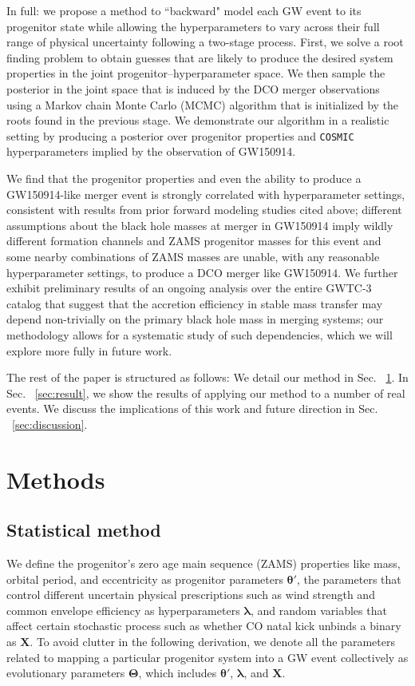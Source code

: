 \documentclass[linenumbers,twocolumn]{aastex631}
\begin{document}
In full: we propose a method to ``backward" model each GW event to its
progenitor state while allowing the hyperparameters to vary across their full
range of physical uncertainty following a two-stage process. First, we solve a
root finding problem to obtain guesses that are likely to produce the desired
system properties in the joint progenitor--hyperparameter space. We then sample
the posterior in the joint space that is induced by the DCO merger observations
using a Markov chain Monte Carlo (MCMC) algorithm that is initialized by the
roots found in the previous stage.  We demonstrate our algorithm in a realistic
setting by producing a posterior over progenitor properties and \texttt{COSMIC}
hyperparameters implied by the observation of GW150914.  

We find that the progenitor properties and even the ability to produce a
GW150914-like merger event is strongly correlated with hyperparameter settings,
consistent with results from prior forward modeling studies cited above;
different assumptions about the black hole masses at merger in GW150914 imply
wildly different formation channels and ZAMS progenitor masses for this event
and some nearby combinations of ZAMS masses are unable, with any reasonable
hyperparameter settings, to produce a DCO merger like GW150914.  We further
exhibit preliminary results of an ongoing analysis over the entire GWTC-3
catalog \citep{GWTC-3} that suggest that the accretion efficiency in stable mass
transfer may depend non-trivially on the primary black hole mass in merging
systems; our methodology allows for a systematic study of such dependencies,
which we will explore more fully in future work.

The rest of the paper is structured as follows: We detail our method in Sec.
~\ref{sec:method}. In Sec. ~\ref{sec:result}, we show the results of applying
our method to a number of real events. We discuss the implications of this work
and future direction in Sec. ~\ref{sec:discussion}.

\section{Methods}
\label{sec:method}

\subsection{Statistical method}
\label{subsec:stats}
We define the progenitor's zero age main sequence (ZAMS) properties like mass,
orbital period, and eccentricity as progenitor parameters $\bm{\theta'}$, the
parameters that control different uncertain physical prescriptions such as wind
strength and common envelope efficiency as hyperparameters $\bm{\lambda}$, and
random variables that affect certain stochastic process such as whether CO natal
kick unbinds a binary as $\bm{X}$. To avoid clutter in the following derivation,
we denote all the parameters related to mapping a particular progenitor system
into a GW event collectively as evolutionary parameters $\bm{\Theta}$, which
includes $\bm{\theta'}$, $\bm{\lambda}$, and $\bm{X}$.
\end{document}
